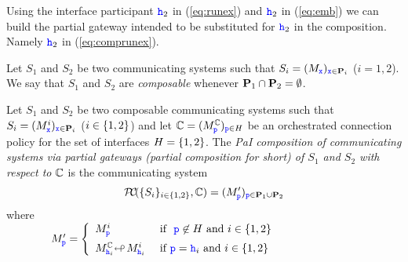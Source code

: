  \smallskip
 \noindent
Using the interface participant ${\mathtt{\color{blue}{ {h}}}}_2$ in (\ref{eq:runex}) and ${\mathtt{\color{blue}{ {h}}}}_2$ in (\ref{eq:emb})  
we can build the partial gateway intended to be substituted for ${\mathtt{\color{blue}{ {h}}}}_2$ in the composition.
Namely ${\mathtt{\color{blue}{ {h}}}}_2$ in (\ref{eq:comprunex}).

 \begin{definition}[Composability]
 \label{def:composability}
Let $S_1$ and $S_2$  be two communicating systems such that $S_i=(M_{{\mathtt{\color{blue}{ {x}}}}})_{{\mathtt{\color{blue}{ {x}}}}\in\mathbf{P}_i}$ ($i=1,2$). 
We say that $S_1$ and $S_2$ are {\em composable} whenever $\mathbf{P}_1\cap\mathbf{P}_2=\emptyset$.
\end{definition} 


\begin{definition}
\label{def:comppgw} 
Let $S_1$ and $S_2$ be two composable communicating systems
such that $S_i=(M^i_{{\mathtt{\color{blue}{ {x}}}}})_{{\mathtt{\color{blue}{ {x}}}}\in\mathbf{P}_i}$ ($i\in\{1,2\}$)
and let  $\mathbb{C}=(M^{\mathbb{C}}_{{\mathtt{\color{blue}{ {p}}}}})_{{\mathtt{\color{blue}{ {p}}}}\in H}$  
 be an orchestrated connection policy for the set of interfaces $H=\{1,2\}$. 
The {\em PaI composition of communicating systems via partial gateways  
(partial composition for short) of 
 $S_1$ and $S_2$ with respect to $\mathbb{C}$} is the communicating system 
$$\mathcal{P}\hspace{-2pt}\mathcal{C}\!(\{S_i\}_{i\in \{1,2\}}, \mathbb{C}) =  (M'_{\mathtt{\color{blue}{ {p}}}})_{{\mathtt{\color{blue}{ {p}}}}\in\mathbf{P}_1\cup\mathbf{P}_2}$$
where\\
${\qquad\qquad}M'_{\mathtt{\color{blue}{ {p}}}} = \left\{ \begin{array}{ll}
                          M^i_{\mathtt{\color{blue}{ {p}}}} 
                                    &  \text{ if }\ {\mathtt{\color{blue}{ {p}}}}\not\in H \text{ and } i\in\{1,2\}
                          \\[2mm]
                          M^{\mathbb{C}}_{{\mathtt{\color{blue}{ {h}}}}_i}{{\looparrowleft}\,}M^i_{{\mathtt{\color{blue}{ {h}}}}_i} & \text{ if } { \ensuremath{\mathtt{\color{blue}{ {p}}}} }={\mathtt{\color{blue}{ {h}}}}_i \text{ and $i\in \{1,2\}$}
                           \end{array}
                 \right.$
\end{definition}



